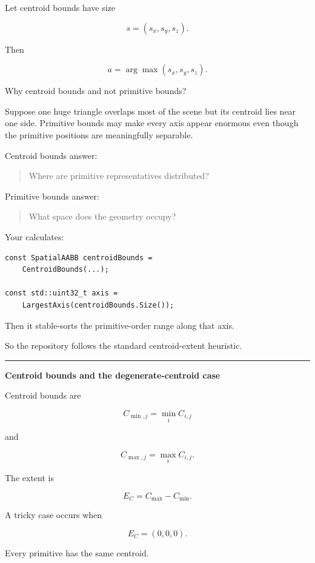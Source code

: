 Let centroid bounds have size

\[
s=(s_x,s_y,s_z).
\]

Then

\[
a=\arg\max(s_x,s_y,s_z).
\]

Why centroid bounds and not primitive bounds?

Suppose one huge triangle overlaps most of the scene but its centroid lies near one side. Primitive bounds may make every axis appear enormous even though the primitive positions are meaningfully separable.

Centroid bounds answer:

\begin{quote}
Where are primitive representatives distributed?
\end{quote}

Primitive bounds answer:

\begin{quote}
What space does the geometry occupy?
\end{quote}

Your  calculates:

\begin{verbatim}
const SpatialAABB centroidBounds =
    CentroidBounds(...);

const std::uint32_t axis =
    LargestAxis(centroidBounds.Size());
\end{verbatim}

Then it stable-sorts the primitive-order range along that axis.

So the repository follows the standard centroid-extent heuristic.

\begin{center}\rule{0.5\linewidth}{0.5pt}\end{center}

\textbf{Centroid bounds and the degenerate-centroid case}

Centroid bounds are

\[
C_{\min,j}
=
\min_i C_{i,j}
\]

and

\[
C_{\max,j}
=
\max_i C_{i,j}.
\]

The extent is

\[
E_C=C_{\max}-C_{\min}.
\]

A tricky case occurs when

\[
E_C=(0,0,0).
\]

Every primitive has the same centroid.

